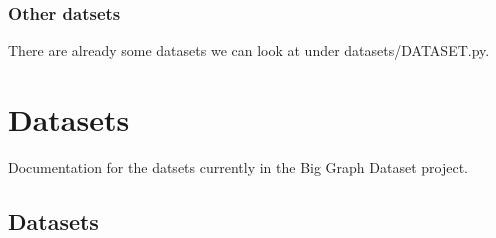\documentclass[letterpaper,10pt,english]{sphinxhowto}
\begin{document}
\subsubsection{Other datsets}
\label{\detokenize{reddit-dataset-example:Other-datsets}}
\sphinxAtStartPar
There are already some datasets we can look at under datasets/DATASET.py.


\section{Datasets}
\label{\detokenize{index:datasets}}
\sphinxAtStartPar
Documentation for the datsets currently in the Big Graph Dataset project.

\sphinxstepscope


\subsection{Datasets}
\label{\detokenize{datasets:module-datasets}}\label{\detokenize{datasets:datasets}}\label{\detokenize{datasets::doc}}
\end{document}
